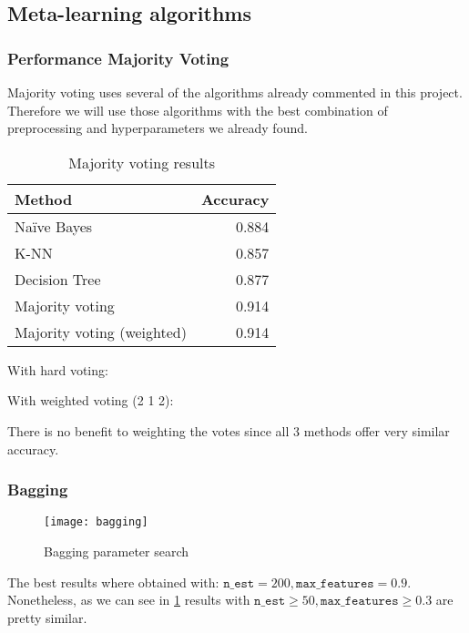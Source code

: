 
\subsection{Meta-learning algorithms}%
\label{sub:meta}

\subsubsection{Performance Majority Voting}

Majority voting uses several of the algorithms already commented in this project. Therefore we will use those algorithms with the best combination of preprocessing and hyperparameters we already found.

\begin{table}[H]
\centering
\caption{Majority voting results}
\begin{tabular}{lr}
\toprule
Method & Accuracy \\
\midrule
Na\"ive Bayes & 0.884 \\
K-NN & 0.857 \\
Decision Tree & 0.877 \\
\addlinespace[0.5em]
Majority voting & 0.914 \\
Majority voting (weighted)  & 0.914 \\
\bottomrule
\end{tabular}
\end{table}


With hard voting:

\noindent
With weighted voting (2 1 2):

There is no benefit to weighting the votes since all 3 methods offer very similar accuracy.

\pagebreak
\subsubsection{Bagging}

\begin{figure}[H]
\centering
\texttt{[image: bagging]}
\caption{Bagging parameter search}%
\label{fig:bagging}
\end{figure}

The best results where obtained with: $\texttt{n\_est} = 200, \texttt{max\_features} = 0.9$. Nonetheless, as we
can see in \cref{fig:bagging} results with $\texttt{n\_est} \geq 50, \texttt{max\_features} \geq 0.3$ are pretty
similar.

